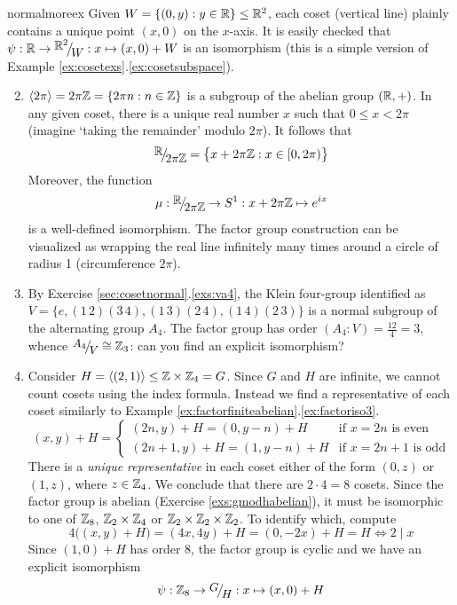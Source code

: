 \begin{examples}{}{normalmoreex}
	\exstart Given $W=\{(0,y):y\in\mathbb{R}\}\le \mathbb{R}^2$, each coset (vertical line) plainly contains a unique point $(x,0)$ on the $x$-axis. It is easily checked that $\psi:\R\to\quotient{\R^2}W:x\mapsto (x,0)+W$ is an isomorphism (this is a simple version of Example \ref*{ex:cosetexs}.\ref{ex:cosetsubspace}).
	

	\begin{enumerate}\setcounter{enumi}{1}
	  \item $\left\langle 2\pi\right\rangle=2\pi\mathbb{Z}=\{2\pi n:n\in\mathbb{Z}\}$ is a subgroup of the abelian group $(\mathbb{R},+)$. In any given coset, there is a unique real number $x$ such that $0\le x<2\pi$ (imagine `taking the remainder' modulo $2\pi$). It follows that
	  \[
	  	\quotient{\R}{2\pi\Z}=\bigl\{x+2\pi\Z:x\in[0,2\pi)\bigr\}
	  \]
	  Moreover, the function
	  \[
	  	\mu:\quotient\R{2\pi\Z}\to S^1:x+2\pi\Z\mapsto e^{ix}
	  \]
	  is a well-defined isomorphism. The factor group construction can be visualized as wrapping the real line infinitely many times around a circle of radius 1 (circumference $2\pi$).
	  
	  \item\label{ex:a4normal} By Exercise \ref*{sec:cosetnormal}.\ref{exs:va4}, the Klein four-group identified as $V=\bigl\{
				e,(1\,2)(3\,4),(1\,3)(2\,4),(1\,4)(2\,3)
			\bigr\}$
	  is a normal subgroup of the alternating group $A_4$. The factor group has order $(A_4:V)=\frac{12}4=3$, whence $\quotient{A_4}{V}\cong\Z_3$: can you find an explicit isomorphism?%
	  
	  
	  \item Consider $H=\left\langle (2,1)\right\rangle\le\mathbb{Z}\times\mathbb{Z}_4=G$. Since $G$ and $H$ are infinite, we cannot count cosets using the index formula. Instead we find a representative of each coset similarly to Example \ref*{ex:factorfiniteabelian}.\ref{ex:factoriso3}.
	  \[
	  	(x,y)+H=
	  	\begin{cases}
	  		(2n,y)+H=(0,y-n)+H&\text{if $x=2n$ is even}\\
	  		(2n+1,y)+H=(1,y-n)+H&\text{if $x=2n+1$ is odd}
	  	\end{cases}
	  \]
	  There is a \emph{unique representative} in each coset either of the form $(0,z)$ or $(1,z)$, where $z\in\mathbb{Z}_4$. We conclude that there are $2\cdot 4=8$ cosets. Since the factor group is abelian (Exercise \ref{exs:gmodhabelian}), it must be isomorphic to one of $\mathbb{Z}_8$, $\mathbb{Z}_2\times\mathbb{Z}_4$ or $\mathbb{Z}_2\times\mathbb{Z}_2\times\mathbb{Z}_2$. To identify which, compute
	  \[
	  	4\bigl((x,y)+H\bigr)=(4x,4y)+H=(0,-2x)+H=H \iff 2\mid x
	  \]
	  Since $(1,0)+H$ has order 8, the factor group is cyclic and we have an explicit isomorphism
	  \[
	  	\psi:\Z_8\to\quotient GH:x\mapsto (x,0)+H
	  \]
	  

\end{enumerate}
\end{examples}
